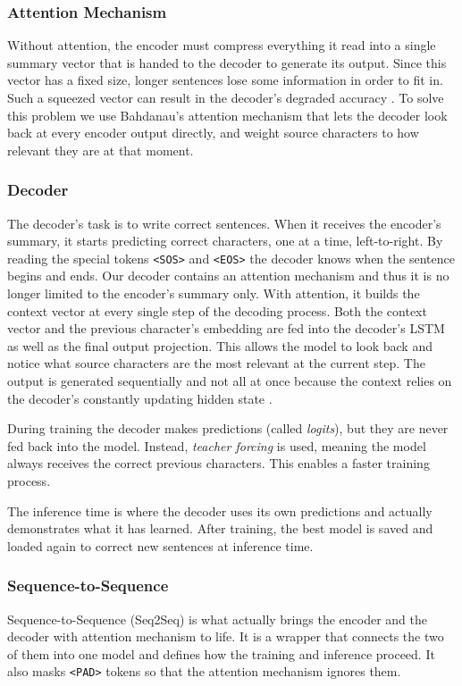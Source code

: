\documentclass[11pt]{article}
\begin{document}
\subsubsection{Attention Mechanism}

Without attention, the encoder must compress everything it read into a single summary vector that is handed to the decoder to generate its output. Since this vector has a fixed size, longer sentences lose some information in order to fit in. Such a squeezed vector can result in the decoder's degraded accuracy \citep{bahdanau-etal-2015-neural}. To solve this problem we use Bahdanau's attention mechanism that lets the decoder look back at every encoder output directly, and weight source characters to how relevant they are at that moment. 


\subsubsection{Decoder}
The decoder's task is to write correct sentences. When it receives the encoder's summary, it starts predicting correct characters, one at a time, left-to-right. By reading the special tokens \texttt{<SOS>} and \texttt{<EOS>} the decoder knows when the sentence begins and ends. Our decoder contains an attention mechanism
and thus it is no longer limited to the encoder's summary only. With attention, it builds the context vector at every single step of the decoding process. Both the context vector and the previous character's embedding are fed into the decoder's LSTM as well as the final output projection. This allows the model to look back and notice what source characters are the most relevant at the current step. The output is generated sequentially and not all at once because the context relies on the decoder's constantly updating hidden state \citep{bahdanau-etal-2015-neural}.

During training the decoder makes predictions (called \emph{logits}), but they are never fed back into the model. Instead, \emph{teacher forcing} is used, meaning the model always receives the correct previous characters. This enables a faster training process. 

The inference time is where the decoder uses its own predictions and actually demonstrates what it has learned. After training, the best model is saved and loaded again to correct new sentences at inference time. 

\subsubsection{Sequence-to-Sequence}
Sequence-to-Sequence (Seq2Seq) is what actually brings the encoder and the decoder with attention mechanism to life. It is a wrapper that connects the two of them into one model and defines how the training and inference proceed. It also masks \texttt{<PAD>} tokens so that the attention mechanism ignores them.
\end{document}
